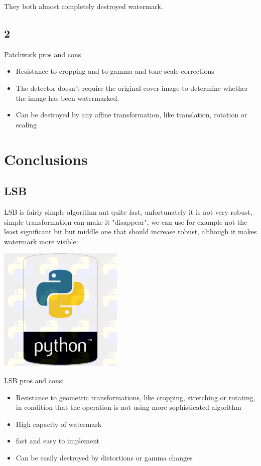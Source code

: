 \documentclass{article}
\begin{document}
    	They both almost completely destroyed watermark.

	\subsection{2}

	Patchwork pros and cons

	\begin{itemize}
		\item Resistance to cropping and to gamma and tone scale corrections
		\item The detector doesn’t require the original cover image to determine whether the image has been watermarked.
		\item Can be destroyed by any affine transformation, like translation, rotation or scaling
	\end{itemize}

\section{Conclusions}

	\subsection{LSB}

	LSB is fairly simple algorithm ant quite fast, unfortunately it is not very robust, simple transformation can make it "disappear", we can use for example not the least significant bit but middle one that should increase robust, although it makes watermark more visible:


	\includegraphics[scale=1.0]{python_lsb/watermarked_python_4bit.png}


	LSB pros and cons:
	\begin{itemize}

		\item Resistance to geometric transformations, like cropping, stretching or rotating, in condition that the operation is not using more sophisticated algorithm
		\item High capacity of watermark
		\item fast and easy to implement
		\item Can be easily destroyed by distortions or gamma changes




	\end{itemize}

	
\end{document}

